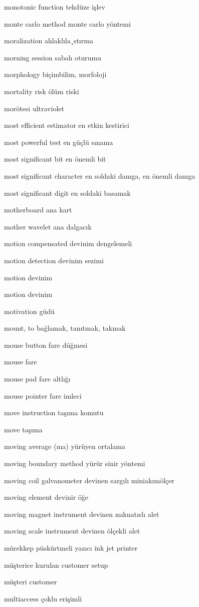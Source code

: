 \documentclass[12pt,fleqn]{article}\usepackage{../../common}
\begin{document}
monotonic function tekdüze işlev

monte carlo method monte carlo yöntemi

moralization ahlaklıla¸stırma

morning session sabah oturumu

morphology biçimbilim, morfoloji

mortality risk ölüm riski

morötesi ultraviolet

most efficient estimator en etkin kestirici

most powerful test en güçlü sınama

most significant bit en önemli bit

most significant character en soldaki damga, en önemli damga

most significant digit en soldaki basamak

motherboard ana kart

mother wavelet ana dalgacık

motion compensated devinim dengelemeli

motion detection devinim sezimi

motion devinim

motion devinim

motivation güdü

mount, to bağlamak, tanıtmak, takmak

mouse button fare düğmesi

mouse fare

mouse pad fare altlığı

mouse pointer fare imleci

move instruction taşıma komutu

move taşıma

moving average (ma) yürüyen ortalama

moving boundary method yürür sinir yöntemi

moving coil galvanometer devinen sargılı miniakımölçer

moving element devinir öğe

moving magnet instrument devinen mıknatıslı alet

moving scale instrument devinen ölçekli alet

mürekkep püskürtmeli yazıcı ink jet printer

müşterice kurulan customer setup

müşteri customer

multiaccess çoklu erişimli
\end{document}
